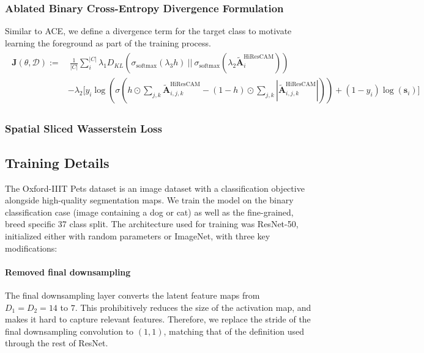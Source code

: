 \documentclass{article}
\theoremstyle{plain}
\theoremstyle{definition}
\theoremstyle{remark}
\begin{document}
\subsubsection{Ablated Binary Cross-Entropy Divergence Formulation}

Similar to ACE, we define a divergence term for the target class to motivate learning the foreground as part of the training process.
\begin{gather}
	\begin{split}
		\mathcal{\bm{J}}(\theta, \mathcal{D}) := &\ \frac{1}{|C|} \sum^{|C|}_{i} \lambda_1 D_{KL}(\sigma_{\text{softmax}}(\lambda_3 h)\ ||\ \sigma_{\text{softmax}}(\lambda_2 \tilde{\mathcal{\bm{A}}}_{i}^{\text{HiResCAM}})) \\
		&- \lambda_2 \bigg[ y_i \log \left(\sigma\left(h \odot \sum_{j,k}\tilde{\mathcal{\bm{A}}}_{i,j,k}^{\text{HiResCAM}} - (1-h) \odot \sum_{j,k}|\tilde{\mathcal{\bm{A}}}_{i,j,k}^{\text{HiResCAM}}|\right) \right) + (1 - y_i) \log \left( \bm{s}_i \right) \bigg]
	\end{split}
\end{gather}

\subsubsection{Spatial Sliced Wasserstein Loss}

\subsection{Training Details}


The Oxford-IIIT Pets dataset is an image dataset with a classification objective alongside high-quality segmentation maps. We train the model on the binary classification case (image containing a dog or cat) as well as the fine-grained, breed specific 37 class split. The architecture used for training was ResNet-50, initialized either with random parameters or ImageNet, with three key modifications:

\paragraph{Removed final downsampling} The final downsampling layer converts the latent feature maps from $D_1 = D_2 = 14$ to $7$. This prohibitively reduces the size of the activation map, and makes it hard to capture relevant features. Therefore, we replace the stride of the final downsampling convolution to $(1,1)$, matching that of the definition used through the rest of ResNet. 
\end{document}
